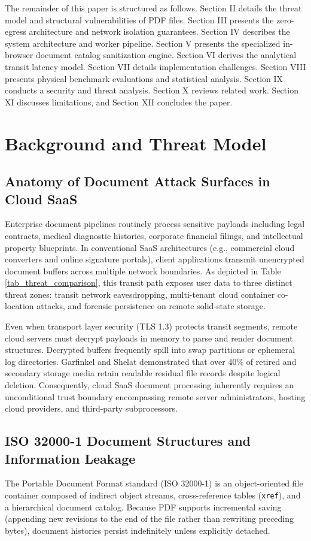 \documentclass[journal]{IEEEtran}
\begin{document}
The remainder of this paper is structured as follows. Section II details the threat model and structural vulnerabilities of PDF files. Section III presents the zero-egress architecture and network isolation guarantees. Section IV describes the system architecture and worker pipeline. Section V presents the specialized in-browser document catalog sanitization engine. Section VI derives the analytical transit latency model. Section VII details implementation challenges. Section VIII presents physical benchmark evaluations and statistical analysis. Section IX conducts a security and threat analysis. Section X reviews related work. Section XI discusses limitations, and Section XII concludes the paper.

\section{Background and Threat Model}

\subsection{Anatomy of Document Attack Surfaces in Cloud SaaS}
Enterprise document pipelines routinely process sensitive payloads including legal contracts, medical diagnostic histories, corporate financial filings, and intellectual property blueprints. In conventional SaaS architectures (e.g., commercial cloud converters and online signature portals), client applications transmit unencrypted document buffers across multiple network boundaries. As depicted in Table \ref{tab_threat_comparison}, this transit path exposes user data to three distinct threat zones: transit network eavesdropping, multi-tenant cloud container co-location attacks, and forensic persistence on remote solid-state storage.

Even when transport layer security (TLS 1.3) protects transit segments, remote cloud servers must decrypt payloads in memory to parse and render document structures. Decrypted buffers frequently spill into swap partitions or ephemeral log directories. Garfinkel and Shelat \cite{garfinkel2003remembrance} demonstrated that over 40\% of retired and secondary storage media retain readable residual file records despite logical deletion. Consequently, cloud SaaS document processing inherently requires an unconditional trust boundary encompassing remote server administrators, hosting cloud providers, and third-party subprocessors.

\subsection{ISO 32000-1 Document Structures and Information Leakage}
The Portable Document Format standard (ISO 32000-1) \cite{iso2008pdf} is an object-oriented file container composed of indirect object streams, cross-reference tables (\texttt{xref}), and a hierarchical document catalog. Because PDF supports incremental saving (appending new revisions to the end of the file rather than rewriting preceding bytes), document histories persist indefinitely unless explicitly detached. 
\end{document}
